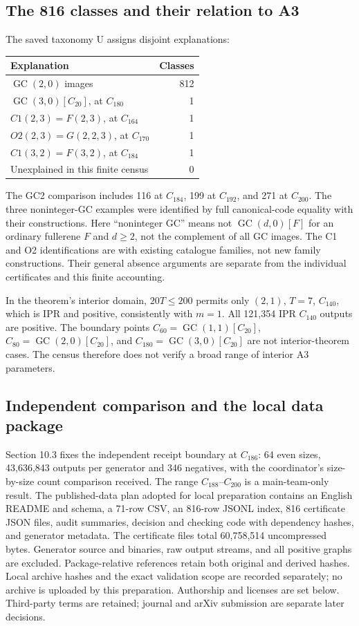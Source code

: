 \documentclass[11pt]{amsart}
\newcommand{\GC}{\operatorname{GC}}
\begin{document}
\subsection{The 816 classes and their relation to A3}
The saved taxonomy U assigns disjoint explanations:
\begin{center}\small
\begin{tabular}{lr}\toprule
Explanation & Classes\\\midrule
$\GC(2,0)$ images &812\\
$\GC(3,0)[C_{20}]$, at $C_{180}$ &1\\
$C1(2,3)=F(2,3)$, at $C_{164}$ &1\\
$O2(2,3)=G(2,2,3)$, at $C_{170}$ &1\\
$C1(3,2)=F(3,2)$, at $C_{184}$ &1\\
Unexplained in this finite census &0\\\bottomrule
\end{tabular}\end{center}
The GC2 comparison includes 116 at $C_{184}$, 199 at $C_{192}$, and
271 at $C_{200}$. The three noninteger-GC examples were identified by
full canonical-code equality with their constructions. Here
``noninteger GC'' means not $\GC(d,0)[F]$ for an ordinary fullerene
$F$ and $d\ge2$, not the complement of all GC images. The C1 and O2
identifications are with existing catalogue families, not new family
constructions. Their general absence arguments are separate from the
individual certificates and this finite accounting.

In the theorem's interior domain, $20T\le200$ permits only $(2,1)$,
$T=7$, $C_{140}$, which is IPR and positive, consistently with $m=1$.
All 121,354 IPR $C_{140}$ outputs are positive. The boundary points
$C_{60}=\GC(1,1)[C_{20}]$, $C_{80}=\GC(2,0)[C_{20}]$, and
$C_{180}=\GC(3,0)[C_{20}]$ are not interior-theorem cases. The census
therefore does not verify a broad range of interior A3 parameters.

\subsection{Independent comparison and the local data package}
Section 10.3 fixes the independent receipt boundary at $C_{186}$:
64 even sizes, 43,636,843 outputs per generator and 346 negatives,
with the coordinator's size-by-size count comparison received.
The range $C_{188}$--$C_{200}$ is a main-team-only result. The published-data plan adopted for local preparation
contains an English README and schema, a 71-row CSV, an 816-row JSONL
index, 816 certificate JSON files, audit summaries, decision and
checking code with dependency hashes, and generator metadata.
The certificate files total 60,758,514 uncompressed bytes. Generator
source and binaries, raw output streams, and all positive graphs are
excluded. Package-relative references retain both original and derived
hashes. Local archive hashes and the exact validation scope are recorded
separately; no archive is uploaded by this preparation. Authorship and licenses are
set below. Third-party terms are retained; journal and arXiv submission
are separate later decisions.
\end{document}
